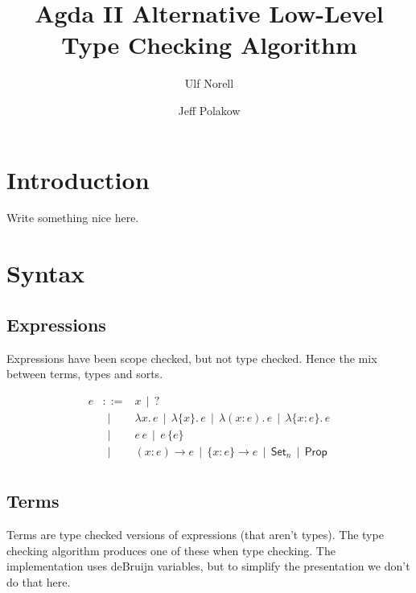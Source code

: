 \documentclass[a4paper,11pt]{article}
\title{Agda II Alternative Low-Level Type Checking Algorithm}
\author{Ulf Norell \and Jeff Polakow}
\newcommand\ignore[1]{}
\newcommand\keyword[1]{\mathbf{#1}}
\newcommand\Coloneqq{\mathrel{::=}}
\newcommand\OR{~~|~~}
\newcommand\Hid[1]{\{#1\}}
\newcommand\lam[1]{\lambda#1.\,}
\newcommand\hlam[1]{\lam{\Hid{#1}}}
\newcommand\tlam[2]{\lam{(#1:#2)}}
\newcommand\thlam[2]{\lam{\Hid{#1:#2}}}
\newcommand\ePi[3]{(#1:#2)\to#3}
\newcommand\ehPi[3]{\{#1:#2\}\to#3}
\newcommand\Let[2]{\keyword{let}~#1~\keyword{in}~#2}
\newcommand\Set[1]{\mathsf{Set}_{#1}}
\newcommand\Prop{\mathsf{Prop}}
\begin{document}
\maketitle

\section{Introduction}

    Write something nice here.

\section{Syntax}

\subsection{Expressions}

    Expressions have been scope checked, but not type checked. Hence the mix
    between terms, types and sorts.

    \[\begin{array}{lcl}
        e & \Coloneqq & x \OR ? \\
          & \OR & \lam xe \OR \hlam xe \OR \tlam xee \OR \thlam xee \\
          & \OR & e\,e \OR e\,\Hid e \\ %
          & \OR & \ePi xee \OR \ehPi xee \OR \Set n \OR \Prop \\
    \end{array}\]

\ignore{
\subsection{Declarations}

    \[\begin{array}{lcl}
        \delta & \Coloneqq & \ldots
    \end{array}\]
}

\subsection{Terms}

    Terms are type checked versions of expressions (that aren't types). The
    type checking algorithm produces one of these when type checking. The
    implementation uses deBruijn variables, but to simplify the presentation
    we don't do that here.
\end{document}
